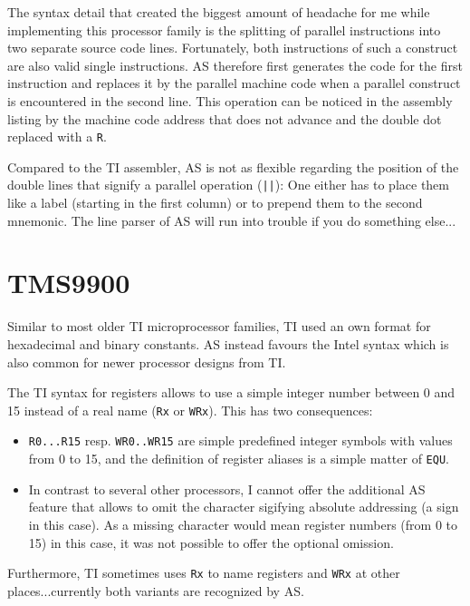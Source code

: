 \documentclass[12pt,twoside]{report}
\newcommand{\tty}[1]{{\tt #1}}
\newcommand{\asname}{{AS}}
\begin{document}
The syntax detail that created the biggest amount of headache for me
while implementing this processor family is the splitting of parallel
instructions into two separate source code lines.  Fortunately, both
instructions of such a construct are also valid single instructions.
\asname{} therefore first generates the code for the first instruction and
replaces it by the parallel machine code when a parallel construct is
encountered in the second line.  This operation can be noticed in the
assembly listing by the machine code address that does not advance
and the double dot replaced with a \tty{R}.

Compared to the TI assembler, \asname{} is not as flexible regarding the
position of the double lines that signify a parallel operation
(\tty{||}): One either has to place them like a label (starting in the
first column) or to prepend them to the second mnemonic.  The line
parser of \asname{} will run into trouble if you do something else...


\section{TMS9900}

Similar to most older TI microprocessor families, TI used an own
format for hexadecimal and binary constants.  \asname{} instead favours the
Intel syntax which is also common for newer processor designs from
TI.

The TI syntax for registers allows to use a simple integer number
between 0 and 15 instead of a real name (\tty{Rx} or \tty{WRx}).
This has two consequences:
\begin{itemize}
\item{\tty{R0...R15} resp. \tty{WR0..WR15} are simple predefined integer
      symbols with values from 0 to 15, and the definition of register
      aliases is a simple matter of \tty{EQU}.}
\item{In contrast to several other processors, I cannot offer the
      additional \asname{} feature that allows to omit the character sigifying
      absolute addressing (a \@ sign in this case).  As a missing
      character would mean register numbers (from 0 to 15) in this case,
      it was not possible to offer the optional omission.}
\end{itemize}
Furthermore, TI sometimes uses \tty{Rx} to name registers and \tty{WRx}
at other places...currently both variants are recognized by \asname{}.
\end{document}
